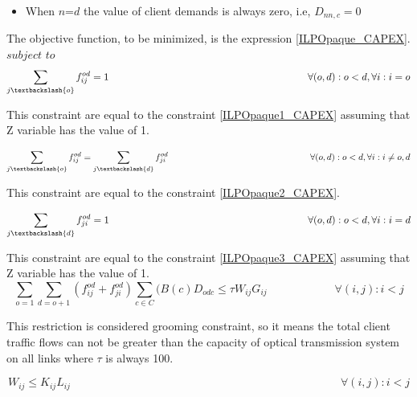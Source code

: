 \begin{itemize}
  \item When $n$=$d$ the value of client demands is always zero, i.e, $D_{nn,c}=0$
\end{itemize}


\vspace{17pt}
The objective function, to be minimized, is the expression \ref{ILPOpaque_CAPEX}.\\

$subject$ $to$
\begin{equation}
\sum_{j\textbackslash \{o\}} f_{ij}^{od} = 1  \qquad \qquad \qquad \qquad \qquad \qquad \qquad \qquad \qquad \qquad
\forall(o,d) : o < d, \forall i: i = o
\label{ILPOpaque1_Surv}
\end{equation}

This constraint are equal to the constraint \ref{ILPOpaque1_CAPEX} assuming that Z variable has the value of 1.

\begin{equation}
\sum_{j\textbackslash \{o\}} f_{ij}^{od} = \sum_{j\textbackslash \{d\}} f_{ji}^{od}   \qquad \qquad \qquad \qquad \qquad \qquad \qquad \qquad
\forall(o,d) : o < d, \forall i: i \neq o,d
\label{ILPOpaque2_Surv}
\end{equation}

This constraint are equal to the constraint \ref{ILPOpaque2_CAPEX}.

\begin{equation}
\sum_{j\textbackslash \{d\}} f_{ji}^{od} = 1  \qquad \qquad \qquad \qquad \qquad \qquad \qquad \qquad \qquad \qquad
\forall(o,d) : o < d, \forall i: i = d
\label{ILPOpaque3_Surv}
\end{equation}

This constraint are equal to the constraint \ref{ILPOpaque3_CAPEX} assuming that Z variable has the value of 1.
\newpage
\begin{equation}
\sum_{o=1} \sum_{d=o+1} \left(f_{ij}^{od} + f_{ji}^{od}\right) \sum_{c\in C} (B\left(c\right) D_{odc}\leq \tau W_{ij} G_{ij} \qquad \qquad \qquad
\forall(i,j) : i < j
\label{ILPOpaque4_Surv}
\end{equation}

This restriction is considered grooming constraint, so it means the total client traffic flows can not be greater than the capacity of optical transmission system on all links where $\tau$ is always 100.

\begin{equation}
W_{ij} \leq K_{ij} L_{ij} \qquad  \qquad \qquad \qquad \qquad \qquad \qquad \qquad \qquad \qquad \qquad \qquad \forall(i,j) : i < j
\label{ILPOpaque5_Surv}
\end{equation}

